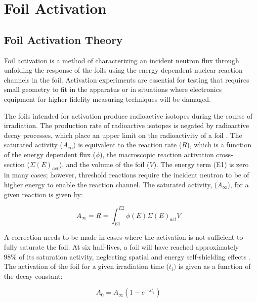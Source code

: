 \section{Foil Activation}

\subsection{Foil Activation Theory}

Foil activation is a method of characterizing an incident neutron flux through unfolding the response of the foils using the energy dependent nuclear reaction channels in the foil. 
Activation experiments are essential for testing that requires small geometry to fit in the apparatus or in situations where electronics equipment for higher fidelity measuring techniques will be damaged. 

The foils intended for activation produce radioactive isotopes during the course of irradiation. 
The production rate of radioactive isotopes is negated by radioactive decay processes, which place an upper limit on the radioactivity of a foil \cite{Knoll}. 
The saturated activity ($A_{\infty}$) is equivalent to the reaction rate ($R$), which is a function of the energy dependent flux ($\phi$), the macroscopic reaction activation cross-section ($\Sigma(E)_{act}$), and the volume of  the foil ($V$). The energy term (E1) is zero in many cases; however, threshold reactions require the incident neutron to be of higher energy to enable the reaction channel. The saturated activity, ($A_{\infty}$), for a given reaction is given by:   

\begin{equation} \label{eq:InfReactionRate}
A_{\infty} = R = \int_{E1}^{E2} \phi(E) \Sigma(E) _{act} V 
\end{equation}

A correction needs to be made in cases where the activation is not sufficient 
to fully saturate the foil. At six half-lives, a foil will have reached 
approximately 98\% of its saturation activity, neglecting spatial and energy 
self-shielding effects \cite{Knoll}. The activation of the foil for a given irradiation time ($t_{i})$ is given as a function of the decay 
constant: 

\begin{equation} \label{eq:ReactionRate}
A_{0} = A_{\infty}(1-e^{-\lambda t_{i}}) 
\end{equation}


